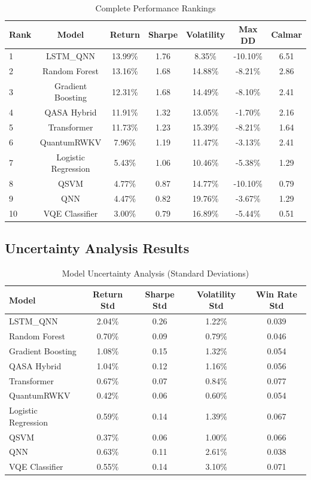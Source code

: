 \documentclass[12pt,a4paper]{article}
\begin{document}
\begin{table}[H]
\centering
\begin{tabular}{@{}lcccccc@{}}
\toprule
\textbf{Rank} & \textbf{Model} & \textbf{Return} & \textbf{Sharpe} & \textbf{Volatility} & \textbf{Max DD} & \textbf{Calmar} \\
\midrule
1 & LSTM\_QNN & 13.99\% & 1.76 & 8.35\% & -10.10\% & 6.51 \\
2 & Random Forest & 13.16\% & 1.68 & 14.88\% & -8.21\% & 2.86 \\
3 & Gradient Boosting & 12.31\% & 1.68 & 14.49\% & -8.10\% & 2.41 \\
4 & QASA Hybrid & 11.91\% & 1.32 & 13.05\% & -1.70\% & 2.16 \\
5 & Transformer & 11.73\% & 1.23 & 15.39\% & -8.21\% & 1.64 \\
6 & QuantumRWKV & 7.96\% & 1.19 & 11.47\% & -3.13\% & 2.41 \\
7 & Logistic Regression & 5.43\% & 1.06 & 10.46\% & -5.38\% & 1.29 \\
8 & QSVM & 4.77\% & 0.87 & 14.77\% & -10.10\% & 0.79 \\
9 & QNN & 4.47\% & 0.82 & 19.76\% & -3.67\% & 1.29 \\
10 & VQE Classifier & 3.00\% & 0.79 & 16.89\% & -5.44\% & 0.51 \\
\bottomrule
\end{tabular}
\caption{Complete Performance Rankings}
\end{table}

\subsection{Uncertainty Analysis Results}

\begin{table}[H]
\centering
\begin{tabular}{@{}lcccc@{}}
\toprule
\textbf{Model} & \textbf{Return Std} & \textbf{Sharpe Std} & \textbf{Volatility Std} & \textbf{Win Rate Std} \\
\midrule
LSTM\_QNN & 2.04\% & 0.26 & 1.22\% & 0.039 \\
Random Forest & 0.70\% & 0.09 & 0.79\% & 0.046 \\
Gradient Boosting & 1.08\% & 0.15 & 1.32\% & 0.054 \\
QASA Hybrid & 1.04\% & 0.12 & 1.16\% & 0.056 \\
Transformer & 0.67\% & 0.07 & 0.84\% & 0.077 \\
QuantumRWKV & 0.42\% & 0.06 & 0.60\% & 0.054 \\
Logistic Regression & 0.59\% & 0.14 & 1.39\% & 0.067 \\
QSVM & 0.37\% & 0.06 & 1.00\% & 0.066 \\
QNN & 0.63\% & 0.11 & 2.61\% & 0.038 \\
VQE Classifier & 0.55\% & 0.14 & 3.10\% & 0.071 \\
\bottomrule
\end{tabular}
\caption{Model Uncertainty Analysis (Standard Deviations)}
\end{table}
\end{document}
